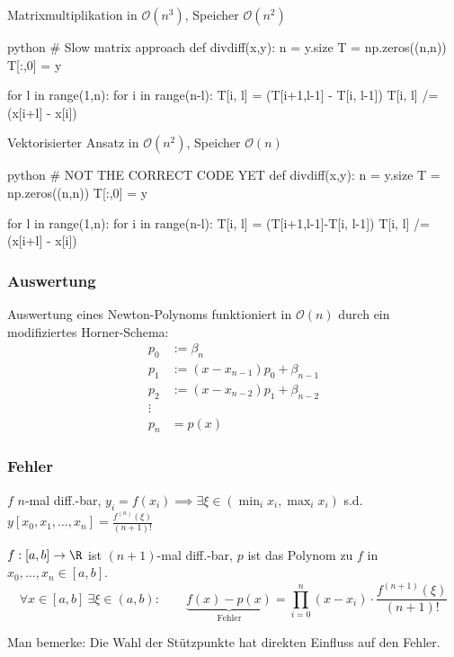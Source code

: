 \newpage
\begin{multicols}{2}

    Matrixmultiplikation in $\mathcal{O}(n^3)$, Speicher $\mathcal{O}(n^2)$

    \begin{code}{python}
    # Slow matrix approach
    def divdiff(x,y):
        n = y.size
        T = np.zeros((n,n))
        T[:,0] = y

        for l in range(1,n):
            for i in range(n-l):
                T[i, l] = (T[i+1,l-1] - T[i, l-1])
                T[i, l] /= (x[i+l] - x[i])
    \end{code}

    \newcolumn


    Vektorisierter Ansatz in $\mathcal{O}(n^2)$, Speicher $\mathcal{O}(n)$

    \begin{code}{python}
    # NOT THE CORRECT CODE YET
    def divdiff(x,y):
        n = y.size
        T = np.zeros((n,n))
        T[:,0] = y

        for l in range(1,n):
            for i in range(n-l):
                T[i, l] = (T[i+1,l-1]-T[i, l-1])
                T[i, l] /= (x[i+l] - x[i])
    \end{code}

\end{multicols}

\subsubsection{Auswertung}

Auswertung eines Newton-Polynoms funktioniert in $\mathcal{O}(n)$ durch ein modifiziertes Horner-Schema:
\begin{align*}
    p_0 &:= \beta_n \\
    p_1 &:= (x - x_{n-1})p_0 + \beta_{n-1} \\
    p_2 &:= (x - x_{n-2})p_1 + \beta_{n-2} \\
    \vdots \\
    p_n &= p(x)
\end{align*}

\subsubsection{Fehler}

\setcounter{all}{11}
\inlinetheorem $f$ $n$-mal diff.-bar, $y_i = f(x_i) \implies \exists \xi \in (\min_i x_i, \max_i x_i)$ s.d. $y[x_0,x_1,\ldots,x_n] = \frac{f^{(n)}(\xi)}{(n+1)!}$

 $f: [a,b] \to \R$ ist $(n+1)$-mal diff.-bar, $p$ ist das Polynom zu $f$ in $x_0,\ldots,x_n \in [a,b]$. 
$$
    \forall x \in [a,b]\ \exists \xi \in (a,b):\quad\quad \underbrace{f(x)-p(x)}_{\text{Fehler}} = \prod_{i=0}^{n}(x-x_i)\cdot\frac{f^{(n+1)}(\xi)}{(n+1)!}
$$

Man bemerke: Die Wahl der Stützpunkte hat direkten Einfluss auf den Fehler.


